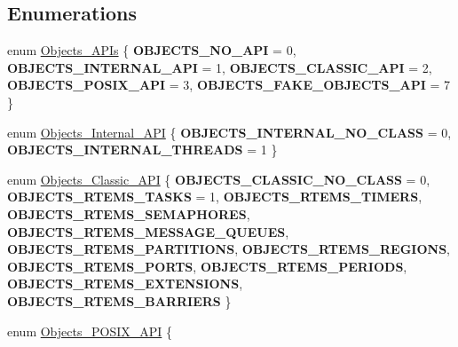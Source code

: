 \subsection*{Enumerations}
\begin{DoxyCompactItemize}
\item 
enum \mbox{\hyperlink{group__RTEMSScoreObject_ga2d2636c8d2f1564f3e5b2b14e761574b}{Objects\+\_\+\+A\+P\+Is}} \{ \newline
{\bfseries O\+B\+J\+E\+C\+T\+S\+\_\+\+N\+O\+\_\+\+A\+PI} = 0, 
{\bfseries O\+B\+J\+E\+C\+T\+S\+\_\+\+I\+N\+T\+E\+R\+N\+A\+L\+\_\+\+A\+PI} = 1, 
{\bfseries O\+B\+J\+E\+C\+T\+S\+\_\+\+C\+L\+A\+S\+S\+I\+C\+\_\+\+A\+PI} = 2, 
{\bfseries O\+B\+J\+E\+C\+T\+S\+\_\+\+P\+O\+S\+I\+X\+\_\+\+A\+PI} = 3, 
\newline
{\bfseries O\+B\+J\+E\+C\+T\+S\+\_\+\+F\+A\+K\+E\+\_\+\+O\+B\+J\+E\+C\+T\+S\+\_\+\+A\+PI} = 7
 \}
\item 
enum \mbox{\hyperlink{group__RTEMSScoreObject_gab0b081c60099c61c644af4cd5f70019f}{Objects\+\_\+\+Internal\+\_\+\+A\+PI}} \{ {\bfseries O\+B\+J\+E\+C\+T\+S\+\_\+\+I\+N\+T\+E\+R\+N\+A\+L\+\_\+\+N\+O\+\_\+\+C\+L\+A\+SS} = 0, 
{\bfseries O\+B\+J\+E\+C\+T\+S\+\_\+\+I\+N\+T\+E\+R\+N\+A\+L\+\_\+\+T\+H\+R\+E\+A\+DS} = 1
 \}
\item 
enum \mbox{\hyperlink{group__RTEMSScoreObject_gaea9b262405122fd6db22e869944b7632}{Objects\+\_\+\+Classic\+\_\+\+A\+PI}} \{ \newline
{\bfseries O\+B\+J\+E\+C\+T\+S\+\_\+\+C\+L\+A\+S\+S\+I\+C\+\_\+\+N\+O\+\_\+\+C\+L\+A\+SS} = 0, 
{\bfseries O\+B\+J\+E\+C\+T\+S\+\_\+\+R\+T\+E\+M\+S\+\_\+\+T\+A\+S\+KS} = 1, 
{\bfseries O\+B\+J\+E\+C\+T\+S\+\_\+\+R\+T\+E\+M\+S\+\_\+\+T\+I\+M\+E\+RS}, 
{\bfseries O\+B\+J\+E\+C\+T\+S\+\_\+\+R\+T\+E\+M\+S\+\_\+\+S\+E\+M\+A\+P\+H\+O\+R\+ES}, 
\newline
{\bfseries O\+B\+J\+E\+C\+T\+S\+\_\+\+R\+T\+E\+M\+S\+\_\+\+M\+E\+S\+S\+A\+G\+E\+\_\+\+Q\+U\+E\+U\+ES}, 
{\bfseries O\+B\+J\+E\+C\+T\+S\+\_\+\+R\+T\+E\+M\+S\+\_\+\+P\+A\+R\+T\+I\+T\+I\+O\+NS}, 
{\bfseries O\+B\+J\+E\+C\+T\+S\+\_\+\+R\+T\+E\+M\+S\+\_\+\+R\+E\+G\+I\+O\+NS}, 
{\bfseries O\+B\+J\+E\+C\+T\+S\+\_\+\+R\+T\+E\+M\+S\+\_\+\+P\+O\+R\+TS}, 
\newline
{\bfseries O\+B\+J\+E\+C\+T\+S\+\_\+\+R\+T\+E\+M\+S\+\_\+\+P\+E\+R\+I\+O\+DS}, 
{\bfseries O\+B\+J\+E\+C\+T\+S\+\_\+\+R\+T\+E\+M\+S\+\_\+\+E\+X\+T\+E\+N\+S\+I\+O\+NS}, 
{\bfseries O\+B\+J\+E\+C\+T\+S\+\_\+\+R\+T\+E\+M\+S\+\_\+\+B\+A\+R\+R\+I\+E\+RS}
 \}
\item 
enum \mbox{\hyperlink{group__RTEMSScoreObject_gaa08d967fe7c8ab07e1c9f9dfec70b01f}{Objects\+\_\+\+P\+O\+S\+I\+X\+\_\+\+A\+PI}} \{ \newline

\end{DoxyCompactItemize}
